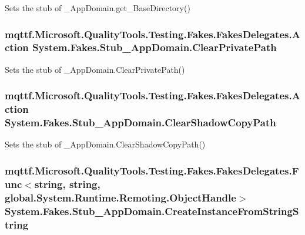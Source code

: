 Sets the stub of \-\_\-\-App\-Domain.\-get\-\_\-\-Base\-Directory()

\hypertarget{class_system_1_1_fakes_1_1_stub___app_domain_aadb1651c5cda96054ba9fd15fbfda137}{
\subsubsection[{Clear\-Private\-Path}]{\setlength{\rightskip}{0pt plus 5cm}mqttf.\-Microsoft.\-Quality\-Tools.\-Testing.\-Fakes.\-Fakes\-Delegates.\-Action System.\-Fakes.\-Stub\-\_\-\-App\-Domain.\-Clear\-Private\-Path}}\label{class_system_1_1_fakes_1_1_stub___app_domain_aadb1651c5cda96054ba9fd15fbfda137}


Sets the stub of \-\_\-\-App\-Domain.\-Clear\-Private\-Path()

\hypertarget{class_system_1_1_fakes_1_1_stub___app_domain_a13749bd2690dbb028bd195c1e177c0a4}{
\subsubsection[{Clear\-Shadow\-Copy\-Path}]{\setlength{\rightskip}{0pt plus 5cm}mqttf.\-Microsoft.\-Quality\-Tools.\-Testing.\-Fakes.\-Fakes\-Delegates.\-Action System.\-Fakes.\-Stub\-\_\-\-App\-Domain.\-Clear\-Shadow\-Copy\-Path}}\label{class_system_1_1_fakes_1_1_stub___app_domain_a13749bd2690dbb028bd195c1e177c0a4}


Sets the stub of \-\_\-\-App\-Domain.\-Clear\-Shadow\-Copy\-Path()

\hypertarget{class_system_1_1_fakes_1_1_stub___app_domain_a3eaa4bf5c36db0d6f29bb8d6072ef9f9}{
\subsubsection[{Create\-Instance\-From\-String\-String}]{\setlength{\rightskip}{0pt plus 5cm}mqttf.\-Microsoft.\-Quality\-Tools.\-Testing.\-Fakes.\-Fakes\-Delegates.\-Func$<$string, string, global.\-System.\-Runtime.\-Remoting.\-Object\-Handle$>$ System.\-Fakes.\-Stub\-\_\-\-App\-Domain.\-Create\-Instance\-From\-String\-String}}\label{class_system_1_1_fakes_1_1_stub___app_domain_a3eaa4bf5c36db0d6f29bb8d6072ef9f9}


